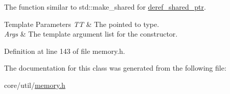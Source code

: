 The function similar to {\ttfamily std\+::make\+\_\+shared} for \hyperlink{classslb_1_1core_1_1util_1_1deref__shared__ptr}{deref\+\_\+shared\+\_\+ptr}. 


\begin{DoxyTemplParams}{Template Parameters}
{\em TT} & The pointed to type. \\
\hline
{\em Args} & The template argument list for the constructor. \\
\hline
\end{DoxyTemplParams}


Definition at line 143 of file memory.\+h.



The documentation for this class was generated from the following file\+:\begin{DoxyCompactItemize}
\item 
core/util/\hyperlink{memory_8h}{memory.\+h}\end{DoxyCompactItemize}
